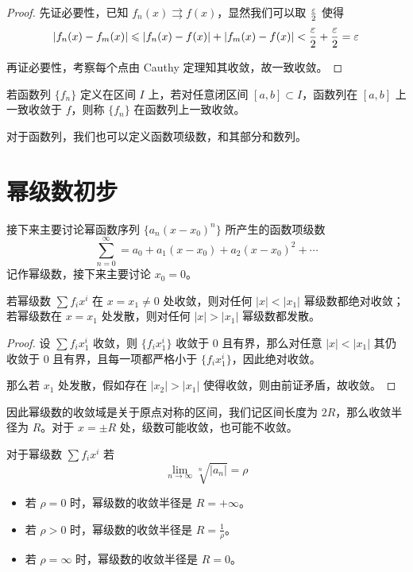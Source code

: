 \begin{proof}
	先证必要性，已知 $f_n(x) \rightrightarrows f(x)$，显然我们可以取 $\frac{\varepsilon}{2}$ 使得
	\[ |f_n(x) - f_m(x)| \leqslant |f_n(x) - f(x)| + |f_m(x) - f(x)| < \frac{\varepsilon}{2} + \frac{\varepsilon}{2} = \varepsilon \]
	
	再证必要性，考察每个点由 Cauthy 定理知其收敛，故一致收敛。
\end{proof}


\begin{definition}
	若函数列 $\{f_n\}$ 定义在区间 $I$ 上，若对任意闭区间 $[a, b] \subset I$，函数列在 $[a, b]$ 上一致收敛于 $f$，则称 $\{f_n\}$ 在函数列上一致收敛。
\end{definition}


对于函数列，我们也可以定义函数项级数，和其部分和数列。

\section{幂级数初步}

接下来主要讨论幂函数序列 $\{a_n(x- x_0)^n \}$ 所产生的函数项级数
\[ \sum_{n=0}^{\infty} = a_0 + a_1(x-x_0) + a_2(x-x_0)^2 + \cdots \]
记作幂级数，接下来主要讨论 $x_0 = 0$。

\begin{theorem}
	若幂级数 $\sum f_i x^i$ 在 $x = x_1 \neq 0$ 处收敛，则对任何 $|x| < |x_1|$ 幂级数都绝对收敛；若幂级数在 $x = x_1$ 处发散，则对任何 $|x| > |x_1|$ 幂级数都发散。
\end{theorem}

\begin{proof}
	设 $\sum f_i x_1^i$ 收敛，则 $\{f_i x_1^i\}$ 收敛于 $0$ 且有界，那么对任意 $|x| < |x_1|$ 其仍收敛于 $0$ 且有界，且每一项都严格小于 $\{f_i x_1^i\}$，因此绝对收敛。
	
	那么若 $x_1$ 处发散，假如存在 $|x_2| > |x_1|$ 使得收敛，则由前证矛盾，故收敛。
\end{proof}

因此幂级数的收敛域是关于原点对称的区间，我们记区间长度为 $2R$，那么收敛半径为 $R$。对于 $x = \pm R$ 处，级数可能收敛，也可能不收敛。

\begin{theorem}
	对于幂级数 $\sum f_i x^i$ 若
	\[ \lim_{n \to \infty} \sqrt[n]{|a_n|} = \rho \]
	\begin{itemize}
		\item 若 $\rho = 0$ 时，幂级数的收敛半径是 $R = +\infty$。
		\item 若 $\rho > 0$ 时，幂级数的收敛半径是 $R = \frac{1}{\rho}$。
		\item 若 $\rho = \infty$ 时，幂级数的收敛半径是 $R = 0$。
	\end{itemize}
\end{theorem}

